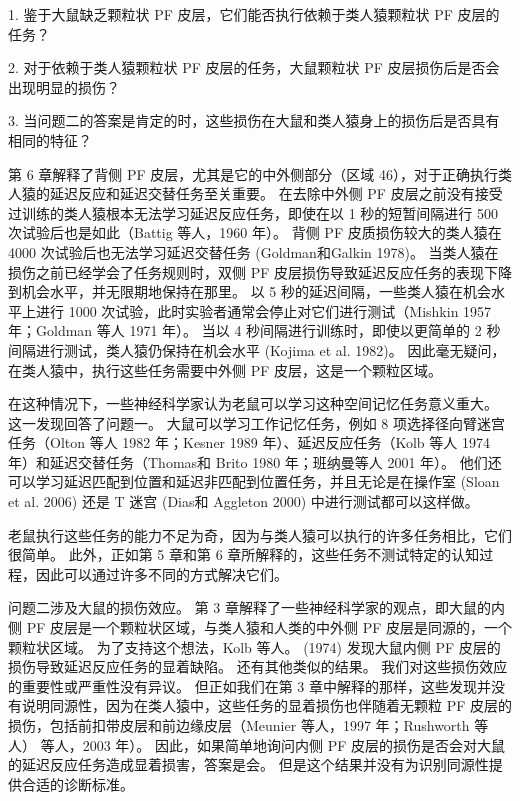 \par 
1. 鉴于大鼠缺乏颗粒状 PF 皮层，它们能否执行依赖于类人猿颗粒状 PF 皮层的任务？
\par 
2. 对于依赖于类人猿颗粒状 PF 皮层的任务，大鼠颗粒状 PF 皮层损伤后是否会出现明显的损伤？
\par 
3. 当问题二的答案是肯定的时，这些损伤在大鼠和类人猿身上的损伤后是否具有相同的特征？
\par 
第 6 章解释了背侧 PF 皮层，尤其是它的中外侧部分（区域 46），对于正确执行类人猿的延迟反应和延迟交替任务至关重要。 在去除中外侧 PF 皮层之前没有接受过训练的类人猿根本无法学习延迟反应任务，即使在以 1 秒的短暂间隔进行 500 次试验后也是如此（Battig 等人，1960 年）。 背侧 PF 皮质损伤较大的类人猿在 4000 次试验后也无法学习延迟交替任务 (Goldman和Galkin 1978)。 当类人猿在损伤之前已经学会了任务规则时，双侧 PF 皮层损伤导致延迟反应任务的表现下降到机会水平，并无限期地保持在那里。 以 5 秒的延迟间隔，一些类人猿在机会水平上进行 1000 次试验，此时实验者通常会停止对它们进行测试（Mishkin 1957 年；Goldman 等人 1971 年）。 当以 4 秒间隔进行训练时，即使以更简单的 2 秒间隔进行测试，类人猿仍保持在机会水平 (Kojima et al. 1982)。 因此毫无疑问，在类人猿中，执行这些任务需要中外侧 PF 皮层，这是一个颗粒区域。
\par 
在这种情况下，一些神经科学家认为老鼠可以学习这种空间记忆任务意义重大。 这一发现回答了问题一。 大鼠可以学习工作记忆任务，例如 8 项选择径向臂迷宫任务（Olton 等人 1982 年；Kesner 1989 年）、延迟反应任务（Kolb 等人 1974 年）和延迟交替任务（Thomas和 Brito 1980 年；班纳曼等人 2001 年）。 他们还可以学习延迟匹配到位置和延迟非匹配到位置任务，并且无论是在操作室 (Sloan et al. 2006) 还是 T 迷宫 (Dias和 Aggleton 2000) 中进行测试都可以这样做。
\par 
老鼠执行这些任务的能力不足为奇，因为与类人猿可以执行的许多任务相比，它们很简单。 此外，正如第 5 章和第 6 章所解释的，这些任务不测试特定的认知过程，因此可以通过许多不同的方式解决它们。
\par 
问题二涉及大鼠的损伤效应。 第 3 章解释了一些神经科学家的观点，即大鼠的内侧 PF 皮层是一个颗粒状区域，与类人猿和人类的中外侧 PF 皮层是同源的，一个颗粒状区域。 为了支持这个想法，Kolb 等人。 (1974) 发现大鼠内侧 PF 皮层的损伤导致延迟反应任务的显着缺陷。 还有其他类似的结果。 我们对这些损伤效应的重要性或严重性没有异议。 但正如我们在第 3 章中解释的那样，这些发现并没有说明同源性，因为在类人猿中，这些任务的显着损伤也伴随着无颗粒 PF 皮层的损伤，包括前扣带皮层和前边缘皮层（Meunier 等人，1997 年；Rushworth 等人） 等人，2003 年）。 因此，如果简单地询问内侧 PF 皮层的损伤是否会对大鼠的延迟反应任务造成显着损害，答案是会。 但是这个结果并没有为识别同源性提供合适的诊断标准。

